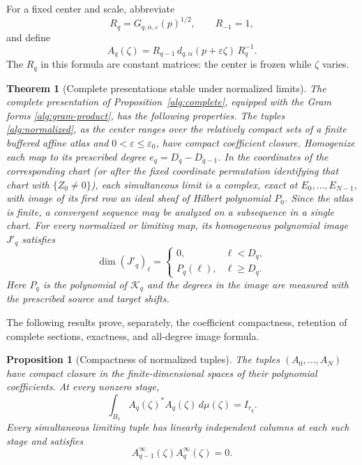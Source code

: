 \documentclass[11pt,reqno]{amsart}
\numberwithin{equation}{section}
\newtheorem{proposition}[theorem]{Proposition}
\newtheorem{thmB}{Theorem}\renewcommand{\thethmB}{B}
\theoremstyle{definition}
\theoremstyle{remark}
\begin{document}
For a fixed center and scale, abbreviate
\[
 R_q=G_{q,\alpha,\varepsilon}(p)^{1/2},
 \qquad R_{-1}=1,
\]
and define
\begin{equation}
 A_q(\zeta)
 =
 R_{q-1}\,d_{q,\alpha}(p+\varepsilon\zeta)\,R_q^{-1}.
 \label{alg:normalized}
\end{equation}
The \(R_q\) in this formula are constant matrices: the center is frozen
while \(\zeta\) varies.

\begin{thmB}[Complete presentations stable under normalized limits]\label{thm:B}
The complete presentation of Proposition~\ref{alg:complete}, equipped
with the Gram forms \eqref{alg:gram-product}, has the following properties.
The tuples \eqref{alg:normalized}, as the center ranges over the relatively
compact sets of a finite buffered affine atlas and $0<\varepsilon\le
\varepsilon_0$, have compact coefficient closure. Homogenize each map to
its prescribed degree $e_q=D_q-D_{q-1}$. In the coordinates of the corresponding chart (or after the fixed
coordinate permutation identifying that chart with $\{Z_0\neq0\}$), each
simultaneous limit is a complex, exact at $E_0,\ldots,E_{N-1}$, with
image of its first row an ideal sheaf of Hilbert polynomial $P_0$.
Since the atlas is finite, a convergent sequence may be analyzed on a
subsequence in a single chart. For every normalized or limiting
map, its homogeneous polynomial image $J'_q$ satisfies
\[
 \dim (J'_q)_\ell=\begin{cases}0,&\ell<D_q,\\
 P_q(\ell),&\ell\ge D_q.\end{cases}
\]
Here $P_q$ is the polynomial of $\mathscr K_q$ and the degrees in the
image are measured with the prescribed source and target shifts.
\end{thmB}
The following results prove, separately, the coefficient compactness,
retention of complete sections, exactness, and all-degree image formula.

\begin{proposition}[Compactness of normalized tuples]
\label{alg:compact}
The tuples \((A_0,\ldots,A_N)\) have compact closure in the
finite-dimensional spaces of their polynomial coefficients. At every
nonzero stage,
\begin{equation}
 \int_{B_1}A_q(\zeta)^*A_q(\zeta)\,d\mu(\zeta)=I_{r_q}.
 \label{alg:orthonormal-columns}
\end{equation}
Every simultaneous limiting tuple has linearly independent columns at
each such stage and satisfies
\[
 A_{q-1}^{\infty}(\zeta)A_q^{\infty}(\zeta)=0.
\]
\end{proposition}
\end{document}
